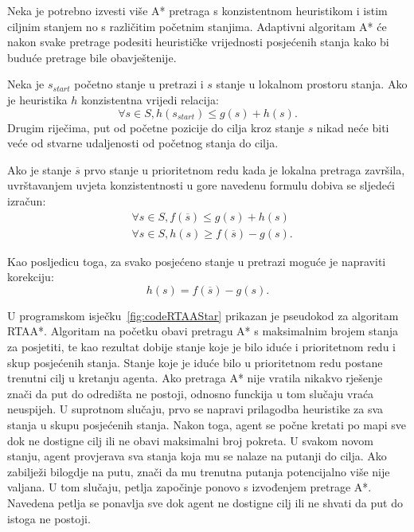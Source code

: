 \documentclass[times, utf8, zavrsni, numeric]{fer}
\begin{document}
\par Neka je potrebno izvesti više A* pretraga s konzistentnom heuristikom i istim ciljnim stanjem no s različitim početnim stanjima. Adaptivni algoritam A* će nakon svake pretrage podesiti heurističke vrijednosti posjećenih stanja kako bi buduće pretrage bile obavještenije\cite{article:RTAAStar}.

\par Neka je \(s_{start}\) početno stanje u pretrazi i \(s\) stanje u lokalnom prostoru stanja. Ako je heuristika \(h\) konzistentna vrijedi relacija:
\begin{equation}
\forall s \in S, h(s_{start}) \leq g(s) + h(s).
\end{equation}
Drugim riječima, put od početne pozicije do cilja kroz stanje \(s\) nikad neće biti veće od stvarne udaljenosti od početnog stanja do cilja.

\par Ako je stanje \(\overline{s}\) prvo stanje u prioritetnom redu kada je lokalna pretraga završila, uvrštavanjem uvjeta konzistentnosti u gore navedenu formulu dobiva se sljedeći izračun:
\begin{equation}
\begin{aligned}
& \forall s \in S, f(\overline{s}) \leq g(s) + h(s)\\
& \forall s \in S, h(s) \geq f(\overline{s}) - g(s).
\end{aligned}
\end{equation}

\par Kao posljedicu toga, za svako posjećeno stanje u pretrazi moguće je napraviti korekciju:
\begin{equation}
h(s) = f(\overline{s}) - g(s).
\end{equation}

\begin{minipage}{\textwidth}
	
\end{minipage}

U programskom isječku~\ref{fig:codeRTAAStar} prikazan je pseudokod za algoritam RTAA*. 
Algoritam na početku obavi pretragu A* s maksimalnim brojem stanja za posjetiti, te kao rezultat dobije stanje koje je bilo iduće i prioritetnom redu i skup posjećenih stanja.
Stanje koje je iduće bilo u prioritetnom redu postane trenutni cilj u kretanju agenta.
Ako pretraga A* nije vratila nikakvo rješenje znači da put do odredišta ne postoji, odnosno funckija u tom slučaju vraća neuspijeh.
U suprotnom slučaju, prvo se napravi prilagodba heuristike za sva stanja u skupu posjećenih stanja.
Nakon toga, agent se počne kretati po mapi sve dok ne dostigne cilj ili ne obavi maksimalni broj pokreta.
U svakom novom stanju, agent provjerava sva stanja koja mu se nalaze na putanji do cilja.
Ako zabilježi bilogdje na putu, znači da mu trenutna putanja potencijalno više nije valjana. 
U tom slučaju, petlja započinje ponovo s izvođenjem pretrage A*.
Navedena petlja se ponavlja sve dok agent ne dostigne cilj ili ne shvati da put do istoga ne postoji.
\end{document}
